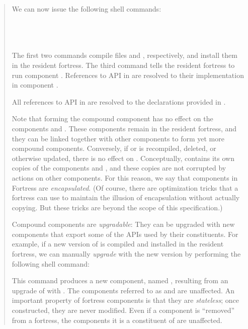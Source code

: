 \begin{description}
\begin{quote}
We can now issue the following shell commands:

 \\
 \\
 \\

The first two commands compile files  and
,
respectively, and install them in the resident fortress. The third
command tells the resident fortress to run component .
References to API  in  are resolved to their
implementation in component .

All references to API  in  are resolved
to the declarations provided in .

Note that forming the compound component  has no effect on the
components  and .
These components remain in the resident
fortress, and they can be linked together with other components to
form yet more compound components.
Conversely, if  or  is
recompiled, deleted, or otherwise updated,
there is no effect on .
Conceptually,  contains its own copies
of the components  and ,
and these copies are not corrupted by actions on other components.
For this reason, we say that components in Fortress
are \emph{encapsulated}. (Of course, there are optimization tricks
that a fortress can use to maintain the illusion of encapsulation
without actually copying. But these tricks are beyond the scope of
this specification.)

Compound components are \emph{upgradable}: They can be upgraded with
new components that export some of the APIs used by their
constituents. For example, if a new version of  is compiled and
installed in the resident fortress,
we can manually \emph{upgrade}  with
the new version by performing the following shell command:


This command produces a new component, named ,
resulting from an upgrade of  with .
The components referred to as  and 
are unaffected. An important property of fortress components is that
they are \emph{stateless}; once constructed, they are never modified.
Even if a component is ``removed'' from a fortress, the components
it is a constituent of are unaffected.


\end{quote}
\end{description}
